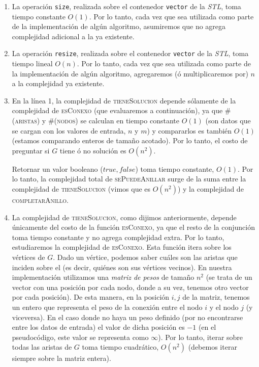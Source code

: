 \begin{enumerate}
  \item La operación \verb|size|, realizada sobre el contenedor \verb|vector| de la
  \textit{STL}, toma tiempo constante $O(1)$. Por lo tanto, cada vez que sea utilizada
  como parte de la implementación de algún algoritmo, asumiremos que no agrega complejidad
  adicional a la ya existente.

  \item La operación \verb|resize|, realizada sobre el contenedor \verb|vector| de la
  \textit{STL}, toma tiempo lineal $O(n)$. Por lo tanto, cada vez que sea utilizada
  como parte de la implementación de algún algoritmo, agregaremos (ó multiplicaremos por)
  $n$ a la complejidad ya existente.

  \item En la línea 1, la complejidad de \textsc{tieneSolucion} depende sólamente de
  la complejidad de \textsc{esConexo} (que evaluaremos a continuación), ya que
  \textsc{\#(aristas)} y \textsc{\#(nodos)} se calculan en tiempo constante $O(1)$
  (son datos que se cargan con los valores de entrada, $n$ y $m$) y compararlos es
  también $O(1)$ (estamos comparando enteros de tamaño acotado).
  Por lo tanto, el costo de preguntar si $G$ tiene ó no solución es $O(n^2)$.

  Retornar un valor booleano ($true, false$) toma tiempo constante, $O(1)$. Por lo tanto,
  la complejidad total de \textsc{sePuedeAnillar} surge de la suma entre la complejidad de
  \textsc{tieneSolucion} (vimos que es $O(n^2)$) y la complejidad de \textsc{completarAnillo}.

  \item La complejidad de \textsc{tieneSolucion}, como dijimos anteriormente, depende
  únicamente del costo de la función \textsc{esConexo}, ya que el resto de la conjunción
  toma tiempo constante y no agrega complejidad extra. Por lo tanto, estudiaremos la
  complejidad de \textsc{esConexo}. Esta función itera sobre los vértices de $G$.
  Dado un vértice, podemos saber cuáles son las aristas que inciden sobre el (es decir,
  quiénes son sus vértices vecinos). En nuestra implementación utilizamos una \textit{matriz de
  pesos} de tamaño $n^2$ (se trata de un vector con una posición por cada nodo, donde a su vez,
  tenemos otro vector por cada posición). De esta manera, en la posición $i,j$ de la matriz,
  tenemos un entero que representa el peso de la conexión entre el nodo $i$ y el nodo $j$ (y viceversa).
  En el caso donde no haya un peso definido (por no encontrarse entre los datos de entrada) el valor
 de dicha posición es $-1$ (en el pseudocódigo, este valor se representa como $\infty$).
  Por lo tanto, iterar sobre todas las aristas de $G$ toma tiempo
  cuadrático, $O(n^2)$ (debemos iterar siempre sobre la matriz entera).
\end{enumerate}

